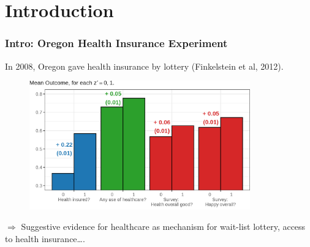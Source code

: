 \documentclass[dvipsnames]{beamer} %
\begin{document}
\section{Introduction}
\begin{frame}
    \frametitle{Intro: Oregon Health Insurance Experiment}
    In 2008, Oregon gave health insurance by lottery (Finkelstein et al, 2012).
    \vspace{-0.875cm}
    \begin{figure}
        \centering
        \singlespacing
        \includegraphics[width=0.85\textwidth]{
            presentation-files/figures/insurance-effects.png}
    \end{figure}
    \vspace{-0.5cm}
    $\Rightarrow$ Suggestive evidence for healthcare as mechanism for wait-list lottery, access to health insurance….
\end{frame}
\end{document}
